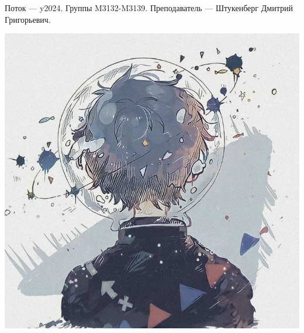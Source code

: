 Поток — y2024.\newline
Группы M3132-M3139.\newline
Преподаватель --- Штукенберг Дмитрий Григорьевич.\par

\begin{center}
   \includegraphics[width=16cm]{assets/omg.jpg}
\end{center}